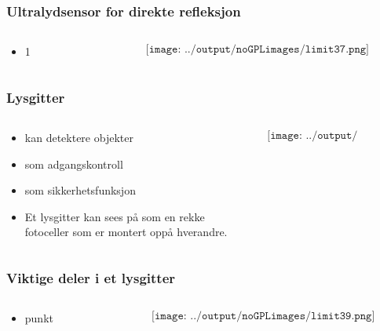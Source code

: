 \documentclass[aspectratio=169,xcolor=dvipsnames]{beamer}
\begin{document}
\begin{frame}
	\frametitle{Ultralydsensor for direkte refleksjon}
	\begin{columns}
		\begin{column}{0.5\textwidth}
			\begin{itemize}
				\item 1
			\end{itemize}

			
		\end{column}

		\begin{column}{0.5\textwidth}
	$$\texttt{[image: ../output/noGPLimages/limit37.png]}$$
		\end{column}
	\end{columns}
\end{frame}
\begin{frame}
	\frametitle{Lysgitter}
	\begin{columns}
		\begin{column}{0.5\textwidth}
			\begin{itemize}
				\item kan detektere objekter
				\item som adgangskontroll
				\item som sikkerhetsfunksjon
				\item Et lysgitter kan sees på som en rekke fotoceller som er montert oppå hverandre. 
			\end{itemize}

			
		\end{column}

		\begin{column}{0.5\textwidth}
	$$\texttt{[image: ../output/noGPLimages/limit38.png]}$$
		\end{column}
	\end{columns}
\end{frame}
\begin{frame}
	\frametitle{Viktige deler i et lysgitter}
	\begin{columns}
		\begin{column}{0.5\textwidth}
			\begin{itemize}
				\item punkt
			\end{itemize}

			
		\end{column}

		\begin{column}{0.5\textwidth}
	$$\texttt{[image: ../output/noGPLimages/limit39.png]}$$
		\end{column}
	\end{columns}
\end{frame}
\end{document}
